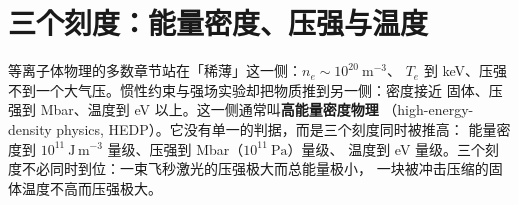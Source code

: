 \section{三个刻度：能量密度、压强与温度}
\label{sec:app-aw-scales}

等离子体物理的多数章节站在「稀薄」这一侧：$n_e\sim10^{20}\ \mathrm{m^{-3}}$、
$T_e$ 到 keV、压强不到一个大气压。惯性约束与强场实验却把物质推到另一侧：密度接近
固体、压强到 Mbar、温度到 eV 以上。这一侧通常叫\textbf{高能量密度物理}
（high-energy-density physics, HEDP）。它没有单一的判据，而是三个刻度同时被推高：
能量密度到 $10^{11}\ \mathrm{J\,m^{-3}}$ 量级、压强到 Mbar（$10^{11}\ \mathrm{Pa}$）量级、
温度到 eV 量级。三个刻度不必同时到位：一束飞秒激光的压强极大而总能量极小，
一块被冲击压缩的固体温度不高而压强极大。

